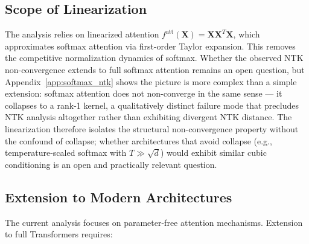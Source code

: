 \documentclass{article}
\theoremstyle{plain}
\theoremstyle{definition}
\theoremstyle{remark}
\begin{document}
\subsection{Scope of Linearization}

The analysis relies on linearized attention $f^{\text{att}}(\mathbf{X}) = \mathbf{X}\mathbf{X}^T\mathbf{X}$, which approximates softmax attention via first-order Taylor expansion. This removes the competitive normalization dynamics of softmax. Whether the observed NTK non-convergence extends to full softmax attention remains an open question, but Appendix~\ref{app:softmax_ntk} shows the picture is more complex than a simple extension: softmax attention does not non-converge in the same sense --- it collapses to a rank-1 kernel, a qualitatively distinct failure mode that precludes NTK analysis altogether rather than exhibiting divergent NTK distance. The linearization therefore isolates the structural non-convergence property without the confound of collapse; whether architectures that avoid collapse (e.g., temperature-scaled softmax with $T \gg \sqrt{d}$) would exhibit similar cubic conditioning is an open and practically relevant question.

\subsection{Extension to Modern Architectures}

The current analysis focuses on parameter-free attention mechanisms. Extension to full Transformers \citep{vaswani2017attention,dosovitskiy2021image} requires:
\end{document}
